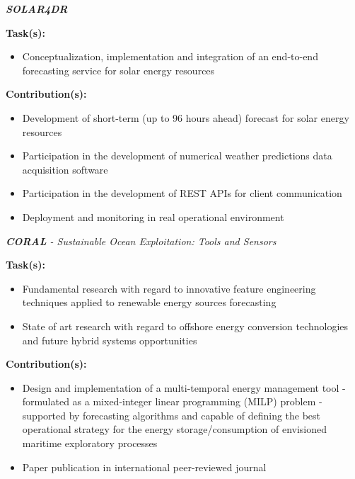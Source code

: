 \documentclass{mycv}
\begin{document}
\begin{myitemize}	
	\item \textit{\textbf{SOLAR4DR}}

		\vspace{0.4cm}
		\textbf{Task(s):}
		
		\begin{itemize}[itemsep=1px]
			\item Conceptualization, implementation and integration of an end-to-end forecasting service for solar energy resources
		\end{itemize}
		
		\vspace{0.2cm}
		\textbf{Contribution(s):}
		
		\begin{itemize}[itemsep=1px]
			\item Development of short-term (up to 96 hours ahead) forecast for solar energy resources
			\item Participation in the development of numerical weather predictions data acquisition software
			\item Participation in the development of REST APIs for client communication
			\item Deployment and monitoring in real operational environment
		\end{itemize}
	
	
	\vspace{0.3cm}	

	\item \textit{\textbf{CORAL} - Sustainable Ocean Exploitation: Tools and Sensors}

		\vspace{0.4cm}
		\textbf{Task(s):}

		\begin{itemize}[itemsep=1px]
			\item Fundamental research with regard to innovative feature engineering techniques applied to renewable energy sources forecasting
			\item State of art research with regard to offshore energy conversion technologies and future hybrid systems opportunities
		\end{itemize}
		
		\vspace{0.2cm}
		\textbf{Contribution(s):}
		
		\begin{itemize}[itemsep=1px]
			\item Design and implementation of a multi-temporal energy management tool - formulated as a mixed-integer linear programming (MILP) problem - supported by forecasting algorithms and capable of defining the best operational strategy for the energy storage/consumption of envisioned maritime exploratory processes
			\item Paper publication in international peer-reviewed journal
		\end{itemize}
		


		
\end{myitemize}
\end{document}
